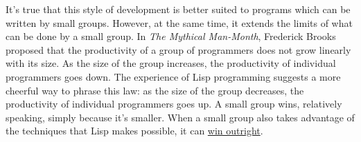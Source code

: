 It's true that this style of development is better suited to programs
which can be written by small groups. However, at the same time, it
extends the limits of what can be done by a small group. In \emph{The
Mythical Man-Month}, Frederick Brooks proposed that the productivity of
a group of programmers does not grow linearly with its size. As the size
of the group increases, the productivity of individual programmers goes
down. The experience of Lisp programming suggests a more cheerful way to
phrase this law: as the size of the group decreases, the productivity of
individual programmers goes up. A small group wins, relatively speaking,
simply because it's smaller. When a small group also takes advantage of
the techniques that Lisp makes possible, it can \href{avg.html}{win
outright}.